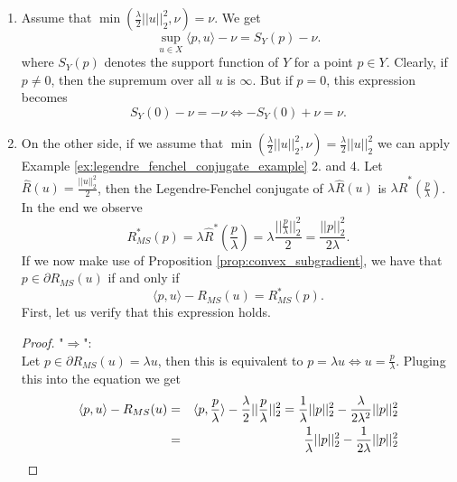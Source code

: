             \begin{enumerate}
                \item Assume that $\min(\frac{\lambda}{2} ||u||_{2}^{2}, \nu) = \nu$. We get
                    $$
                        \sup_{u \in X} \langle p, u \rangle - \nu = S_{Y}(p) - \nu.
                    $$
                where $S_{Y}(p)$ denotes the support function of $Y$ for a point $p \in Y$. Clearly, if $p \neq 0$, then the supremum over all $u$ is $\infty$. But if $p = 0$, this expression becomes
                    $$
                        S_{Y}(0) - \nu = - \nu \Longleftrightarrow -S_{Y}(0) + \nu = \nu.
                    $$
                \item On the other side, if we assume that $\min(\frac{\lambda}{2} ||u||_{2}^{2}, \nu) = \frac{\lambda}{2} ||u||_{2}^{2}$ we can apply Example \ref{ex:legendre_fenchel_conjugate_example} 2. and 4. Let $\hat{R}(u) = \frac{||u||_{2}^{2}}{2}$, then the Legendre-Fenchel conjugate of $\lambda \hat{R}(u)$ is $\lambda \hat{R}^{\ast}(\frac{p}{\lambda})$. In the end we observe
                    \begin{equation}
                        R_{MS}^{\ast}(p) = \lambda \hat{R}^{\ast}(\frac{p}{\lambda}) = \lambda \frac{||\frac{p}{\lambda}||_{2}^{2}}{2} = \frac{||p||_{2}^{2}}{2\lambda}.
                    \label{eq:mumford_shah_convex_conjugate}
                    \end{equation}
                If we now make use of Proposition \ref{prop:convex_subgradient}, we have that $p \in \partial R_{MS}(u)$ if and only if
                    $$
                        \langle p, u \rangle - R_{MS}(u) = R_{MS}^{\ast}(p).
                    $$
                First, let us verify that this expression holds.
                    \begin{proof}
                        "$\Longrightarrow$":\\
                        Let $p \in \partial R_{MS}(u) = \lambda u$, then this is equivalent to $p = \lambda u \Longleftrightarrow u = \frac{p}{\lambda}$. Pluging this into the equation we get
                            \begin{eqnarray}
                                \langle p, u \rangle - R_{MS}(u) &=& \langle p, \frac{p}{\lambda} \rangle - \frac{\lambda}{2}||\frac{p}{\lambda}||_{2}^{2} = \frac{1}{\lambda} ||p||_{2}^{2} - \frac{\lambda}{2 \lambda^{2}} ||p||_{2}^{2} \notag \\
                                &=& \frac{1}{\lambda} ||p||_{2}^{2} - \frac{1}{2 \lambda} ||p||_{2}^{2} \notag \\

\end{eqnarray}
\end{proof}
\end{enumerate}
